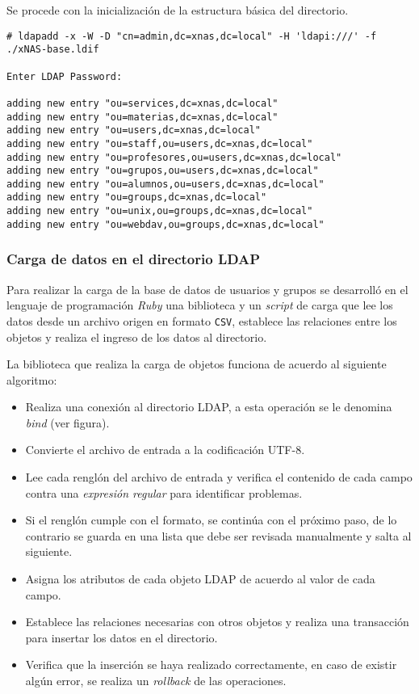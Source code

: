 Se procede con la inicializaci\'{o}n de la estructura b\'{a}sica del directorio.

{
\scriptsize
\linespread{1}
\begin{verbatim}
# ldapadd -x -W -D "cn=admin,dc=xnas,dc=local" -H 'ldapi:///' -f ./xNAS-base.ldif

Enter LDAP Password: 

adding new entry "ou=services,dc=xnas,dc=local"
adding new entry "ou=materias,dc=xnas,dc=local"
adding new entry "ou=users,dc=xnas,dc=local"
adding new entry "ou=staff,ou=users,dc=xnas,dc=local"
adding new entry "ou=profesores,ou=users,dc=xnas,dc=local"
adding new entry "ou=grupos,ou=users,dc=xnas,dc=local"
adding new entry "ou=alumnos,ou=users,dc=xnas,dc=local"
adding new entry "ou=groups,dc=xnas,dc=local"
adding new entry "ou=unix,ou=groups,dc=xnas,dc=local"
adding new entry "ou=webdav,ou=groups,dc=xnas,dc=local"
\end{verbatim}
}

\newpage
          \subsubsection {Carga de datos en el directorio \textsc{LDAP}}

Para realizar la carga de la base de datos de usuarios y grupos se desarroll\'{o} en el lenguaje de programaci\'{o}n \textsl{Ruby} una biblioteca y un \textit{script} de carga que lee los datos desde un archivo origen en formato \texttt{CSV}, establece las relaciones entre los objetos y realiza el ingreso de los datos al directorio.

La biblioteca que realiza la carga de objetos funciona de acuerdo al siguiente algoritmo:

\begin{itemize}
  \item Realiza una conexi\'{o}n al directorio LDAP, a esta operaci\'{o}n se le denomina \textit{bind} (ver figura).
  \item Convierte el archivo de entrada a la codificaci\'{o}n \textsc{UTF-8}.
  \item Lee cada rengl\'{o}n del archivo de entrada y verifica el contenido de cada campo contra una \textit{expresi\'{o}n regular} para identificar problemas.
  \item Si el rengl\'{o}n cumple con el formato, se contin\'{u}a con el pr\'{o}ximo paso, de lo contrario se guarda en una lista que debe ser revisada manualmente y salta al siguiente.
  \item Asigna los atributos de cada objeto LDAP de acuerdo al valor de cada campo.
  \item Establece las relaciones necesarias con otros objetos y realiza una transacci\'{o}n para insertar los datos en el directorio.
  \item Verifica que la inserci\'{o}n se haya realizado correctamente, en caso de existir alg\'{u}n error, se realiza un \textit{rollback} de las operaciones.
\end{itemize}

